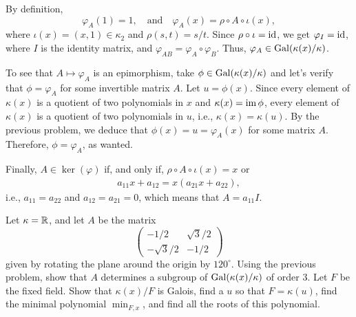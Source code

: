\begin{solution}
    By definition,
    $$
        \varphi_A(1)=1,\quad\text{and}\quad
        \varphi_A(x)=\rho\circ A\circ\iota(x),
    $$
    where $\iota(x)=(x,1)\in\kappa_2$ and $\rho(s,t)=s/t$. Since $\rho\circ\iota=\operatorname{id}$, we get $\varphi_I=\operatorname{id}$, where $I$ is the identity matrix, and $\varphi_{AB}=\varphi_A\circ\varphi_B$. Thus, $\varphi_A\in\operatorname{Gal}(\kappa(x)/\kappa)$.

    To see that $A\mapsto\varphi_A$ is an epimorphism, take $\phi\in\operatorname{Gal}(\kappa(x)/\kappa)$ and let's verify that $\phi=\varphi_A$ for some invertible matrix $A$. Let $u=\phi(x)$. Since every element of $\kappa(x)$ is a quotient of two polynomials in $x$ and $\kappa(x)=\operatorname{im}\phi$, every element of $\kappa(x)$ is a quotient of two polynomials in $u$, i.e., $\kappa(x)=\kappa(u)$. By the previous problem, we deduce that $\phi(x)=u=\varphi_A(x)$ for some matrix $A$. Therefore, $\phi=\varphi_A$, as wanted.

    Finally, $A\in\ker(\varphi)$ if, and only if, $\rho\circ A\circ\iota(x)=x$ or
    \begin{align*}
        a_{11}x+a_{12} = x(a_{21}x+a_{22}),
    \end{align*}
    i.e., $a_{11}=a_{22}$ and $a_{12}=a_{21}=0$, which means that $A=a_{11}I$.
    
\end{solution}

\begin{probl}
    Let\/ $\kappa = \mathbb{R}$, and let\/ $A$ be the matrix
    $$
        \begin{pmatrix}
            -1/2    &\sqrt3/2\\
            -\sqrt3/2    &-1/2
        \end{pmatrix}
    $$
    given by rotating the plane around the origin by\/ $120^\circ$. Using the previous problem, show that\/ $A$ determines a subgroup of\/ $\operatorname{Gal}(\kappa(x)/\kappa)$ of order\/ $3$. Let\/ $F$ be the fixed field. Show that\/ $\kappa(x)/F$ is Galois, find a\/ $u$ so that\/ $F=\kappa(u)$, find the minimal polynomial\/ $\min_{F,x}$, and find all the roots of this polynomial.
\end{probl}

